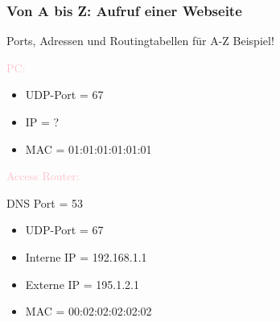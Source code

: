 





\subsubsection*{Von A bis Z: Aufruf einer Webseite}

\begin{example2}{Ports{,} Adressen und Routingtabellen} für A-Z Beispiel!\\
    \begin{minipage}{0.5\linewidth}
        \textcolor{pink}{PC:} 
        {\small
        \begin{itemize}
            \item UDP-Port = 67
            \item IP = ?
            \item MAC = 01:01:01:01:01:01
        \end{itemize}}

        \vspace{2mm}

    \end{minipage}
    \begin{minipage}{0.5\linewidth}
        \textcolor{pink}{Access Router:} 
        {\small DNS Port = 53
    \begin{itemize}
        \item UDP-Port = 67
        \item Interne IP = 192.168.1.1
        \item Externe IP = 195.1.2.1
        \item MAC = 00:02:02:02:02:02
    \end{itemize}}

    \vspace{0.5mm}

    \end{minipage}

\end{example2}


